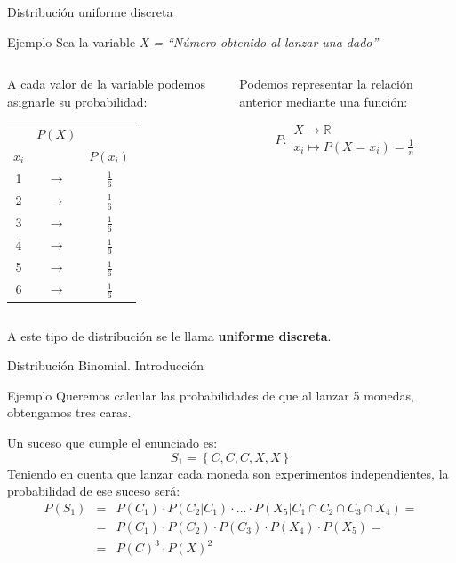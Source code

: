 \documentclass[11pt]{beamer}
\begin{document}
\begin{frame}
{Distribución uniforme discreta}
\begin{block}{Ejemplo}
Sea la variable \emph{X = “Número obtenido al lanzar una dado”}
\end{block}
\pause
\begin{columns}
\begin{column}{0.5 \textwidth}
A cada valor de la variable podemos asignarle su probabilidad:
\begin{center}
\begin{tabular}{ccc}
 & $P(X)$ &  \\
$x_i$ &  &  $P(x_i)$\\ \hline 
1 & $\rightarrow$ & $\tfrac{1}{6}$ \\ 
2 & $\rightarrow$ & $\tfrac{1}{6}$ \\ 
3 & $\rightarrow$ & $\tfrac{1}{6}$ \\ 
4 & $\rightarrow$ & $\tfrac{1}{6}$ \\ 
5 & $\rightarrow$ & $\tfrac{1}{6}$ \\ 
6 & $\rightarrow$ & $\tfrac{1}{6}$ \\ 
\end{tabular} 
\end{center}
\end{column}
\pause
\begin{column}{0.5 \textwidth}
 Podemos representar la relación anterior mediante una función:

$$P\colon \begin{array}{ll} 
          X \rightarrow \mathbb{R} \\ 
          x_i\mapsto P(X=x_i)=\frac{1}{n} 
         \end{array}$$
\end{column}
\end{columns}

\pause
A este tipo de distribución se le llama \textbf{uniforme discreta}.
\end{frame}

\begin{frame}
{Distribución Binomial. Introducción}
\begin{block}{Ejemplo} Queremos calcular las probabilidades de que al lanzar 5 monedas, obtengamos tres caras.
\end{block}
Un suceso que cumple el enunciado es:
$$S_1=\left\lbrace C,C,C,X,X \right\rbrace$$
Teniendo en cuenta que lanzar cada moneda son experimentos independientes, la probabilidad de ese suceso será:
\begin{eqnarray*}
P\left(S_1\right) & = &P\left(C_1\right)\cdot P\left(C_2 | C_1 \right)\cdot ... \cdot P\left(X_5 | C_1 \cap C_2  \cap C_3  \cap X_4   \right)= \\ &  = & P\left(C_1\right)\cdot  P\left(C_2\right) \cdot P\left(C_3\right) \cdot P\left(X_4\right) \cdot P\left(X_5\right)= \\
& = & P\left(C\right)^3\cdot  P\left(X\right)^2
\end{eqnarray*}


\end{frame}
\end{document}
